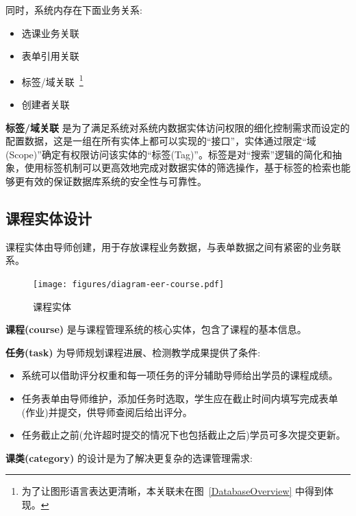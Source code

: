 同时，系统内存在下面业务关系:

\begin{itemize}
  \item 选课业务关联
  \item 表单引用关联
  \item 标签/域关联~\footnote{为了让图形语言表达更清晰，本关联未在图~\ref{DatabaseOverview} 中得到体现。}
  \item 创建者关联
\end{itemize}

\textbf{标签/域关联} 是为了满足系统对系统内数据实体访问权限的细化控制需求而设定的配置数据，这是一组在所有实体上都可以实现的“接口”，实体通过限定“域(Scope)”确定有权限访问该实体的“标签(Tag)”。标签是对“搜索”逻辑的简化和抽象，使用标签机制可以更高效地完成对数据实体的筛选操作，基于标签的检索也能够更有效的保证数据库系统的安全性与可靠性。

\newpage

\subsection{课程实体设计}

课程实体由导师创建，用于存放课程业务数据，与表单数据之间有紧密的业务联系。

\begin{figure}[!h]
  \begin{center}
    \texttt{[image: figures/diagram-eer-course.pdf]}
    \caption{课程实体\label{DatabaseEntityCourse}}
  \end{center}
\end{figure}

\textbf{课程(course)} 是与课程管理系统的核心实体，包含了课程的基本信息。

\textbf{任务(task)} 为导师规划课程进展、检测教学成果提供了条件:

\begin{itemize}
  \item 系统可以借助评分权重和每一项任务的评分辅助导师给出学员的课程成绩。

  \item 任务表单由导师维护，添加任务时选取，学生应在截止时间内填写完成表单(作业)并提交，供导师查阅后给出评分。

  \item 任务截止之前(允许超时提交的情况下也包括截止之后)学员可多次提交更新。
\end{itemize}

\textbf{课类(category)} 的设计是为了解决更复杂的选课管理需求:

